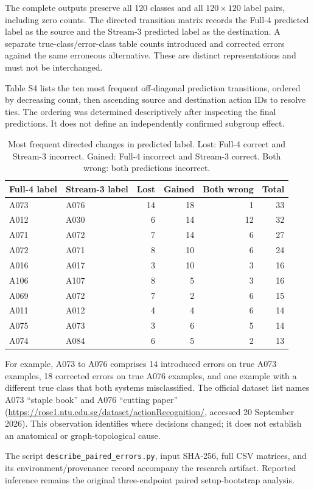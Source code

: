 \documentclass[10pt,a4paper]{article}
\begin{document}
The complete outputs preserve all 120 classes and all $120\times120$ label pairs, including zero counts. The directed transition matrix records the Full-4 predicted label as the source and the Stream-3 predicted label as the destination. A separate true-class/error-class table counts introduced and corrected errors against the same erroneous alternative. These are distinct representations and must not be interchanged.

Table S4 lists the ten most frequent off-diagonal prediction transitions, ordered by decreasing count, then ascending source and destination action IDs to resolve ties. The ordering was determined descriptively after inspecting the final predictions. It does not define an independently confirmed subgroup effect.

\begin{table}[h]\centering\small
\caption{Most frequent directed changes in predicted label. Lost: Full-4 correct and Stream-3 incorrect. Gained: Full-4 incorrect and Stream-3 correct. Both wrong: both predictions incorrect.}
\begin{tabular}{llrrrr}
\toprule
Full-4 label & Stream-3 label & Lost & Gained & Both wrong & Total\\
\midrule
A073 & A076 & 14 & 18 & 1 & 33 \\
A012 & A030 & 6 & 14 & 12 & 32 \\
A071 & A072 & 7 & 14 & 6 & 27 \\
A072 & A071 & 8 & 10 & 6 & 24 \\
A016 & A017 & 3 & 10 & 3 & 16 \\
A106 & A107 & 8 & 5 & 3 & 16 \\
A069 & A072 & 7 & 2 & 6 & 15 \\
A011 & A012 & 4 & 4 & 6 & 14 \\
A075 & A073 & 3 & 6 & 5 & 14 \\
A074 & A084 & 6 & 5 & 2 & 13 \\
\bottomrule
\end{tabular}
\end{table}

For example, A073 to A076 comprises 14 introduced errors on true A073 examples, 18 corrected errors on true A076 examples, and one example with a different true class that both systems misclassified. The official dataset list names A073 ``staple book'' and A076 ``cutting paper'' (\url{https://rose1.ntu.edu.sg/dataset/actionRecognition/}, accessed 20 September 2026). This observation identifies where decisions changed; it does not establish an anatomical or graph-topological cause.

The script \texttt{describe\_paired\_errors.py}, input SHA-256, full CSV matrices, and its environment/provenance record accompany the research artifact. Reported inference remains the original three-endpoint paired setup-bootstrap analysis.
\end{document}

